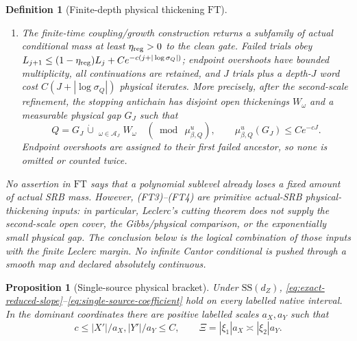 \documentclass[11pt]{article}
\newtheorem{proposition}[theorem]{Proposition}
\newtheorem{definition}[theorem]{Definition}
\begin{document}
\begin{definition}[Finite-depth physical thickening $\mathrm{FT}$]
\begin{enumerate}[label=\textup{(FT\arabic*)}]
      \begin{equation}
      \label{eq:two-scale-physical-diameter}
       \operatorname{diam}W\le
       \rho_V:=\frac{\sigma_Q^{1+\alpha_L}}{8\Lambda_V(P)}.
      \end{equation}
      Every such descendant meets the corresponding Cantor child, all legal
      descendants are retained, their physical and Gibbs weights remain
      uniformly comparable, and the added depth is at most
      $C(1+d_{\rm ph}+d_0)|\log\sigma_Q|$ on the good contexts of
      Lemma~\ref{lem:gate-buffer}.
      This is the second physical scale; no affine jet is absorbed into $P$.
\item The finite-time coupling/growth construction returns a subfamily of
      actual conditional mass at least $\eta_{\rm reg}>0$ to the clean gate.
      Failed trials obey
      $L_{j+1}\le(1-\eta_{\rm reg})L_j+Ce^{-c(j+|\log\sigma_Q|)}$;
      endpoint overshoots have bounded multiplicity, all continuations are
      retained, and $J$ trials plus a depth-$J$ word cost
      $C(J+|\log\sigma_Q|)$ physical iterates.
      More precisely, after the second-scale refinement, the stopping
      antichain has disjoint open thickenings $W_\omega$ and a measurable
      physical gap $G_J$ such that
      \begin{equation}
      \label{eq:finite-antichain-physical-cover}
       Q=G_J\,\dot\cup\!\mathop{\dot\bigcup}_{\omega\in\mathcal A_J}W_\omega
       \quad(\bmod\ \mu^u_{\beta,Q}),\qquad
       \mu^u_{\beta,Q}(G_J)\le Ce^{-cJ}.
      \end{equation}
      Endpoint overshoots are assigned to their first failed ancestor, so
      none is omitted or counted twice.
\end{enumerate}
No assertion in $\mathrm{FT}$ says that a polynomial sublevel already loses a
fixed amount of actual SRB mass.  However, \textup{(FT3)--(FT4)} are primitive
actual-SRB physical-thickening inputs: in particular, Leclerc's cutting theorem
does not supply the second-scale open cover, the Gibbs/physical comparison, or
the exponentially small physical gap.  The conclusion below is the logical
combination of those inputs with the finite Leclerc margin.  No infinite
Cantor conditional is pushed through a smooth map and declared absolutely
continuous.
\end{definition}

\begin{proposition}[Single-source physical bracket]
\label{prop:exact-reduced-slope}
Under $\mathrm{SS}(d_Z)$,
\eqref{eq:exact-reduced-slope}--\eqref{eq:single-source-coefficient} hold on
every labelled native interval.  In the dominant coordinates there are
positive labelled scales $a_X,a_Y$ such that
\begin{equation}
\label{eq:dominant-coordinate-normalization}
 c\le |X'|/a_X,|Y'|/a_Y\le C,
 \qquad \Xi=|\xi_1|a_X\asymp|\xi_2|a_Y.
\end{equation}
\end{proposition}
\end{document}
